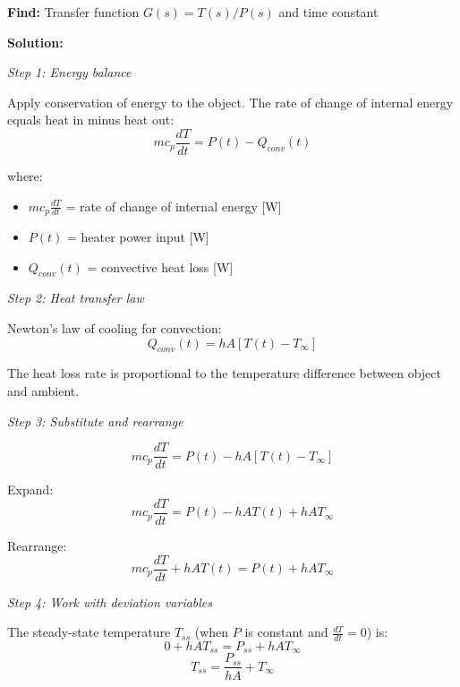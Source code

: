 \begin{example}
\textbf{Find:} Transfer function $G(s) = T(s)/P(s)$ and time constant

\textbf{Solution:}

\textit{Step 1: Energy balance}

Apply conservation of energy to the object. The rate of change of internal energy equals heat in minus heat out:
\begin{equation}
mc_p\frac{dT}{dt} = P(t) - Q_{conv}(t)
\end{equation}

where:
\begin{itemize}
    \item $mc_p\frac{dT}{dt}$ = rate of change of internal energy [W]
    \item $P(t)$ = heater power input [W]
    \item $Q_{conv}(t)$ = convective heat loss [W]
\end{itemize}

\textit{Step 2: Heat transfer law}

Newton's law of cooling for convection:
\begin{equation}
Q_{conv}(t) = hA[T(t) - T_\infty]
\end{equation}

The heat loss rate is proportional to the temperature difference between object and ambient.

\textit{Step 3: Substitute and rearrange}

\begin{equation}
mc_p\frac{dT}{dt} = P(t) - hA[T(t) - T_\infty]
\end{equation}

Expand:
\begin{equation}
mc_p\frac{dT}{dt} = P(t) - hAT(t) + hAT_\infty
\end{equation}

Rearrange:
\begin{equation}
mc_p\frac{dT}{dt} + hAT(t) = P(t) + hAT_\infty
\label{eq:thermal_diffeq}
\end{equation}

\textit{Step 4: Work with deviation variables}

The steady-state temperature $T_{ss}$ (when $P$ is constant and $\frac{dT}{dt} = 0$) is:
\begin{equation}
0 + hAT_{ss} = P_{ss} + hAT_\infty
\end{equation}
\begin{equation}
T_{ss} = \frac{P_{ss}}{hA} + T_\infty
\end{equation}


\end{example}
